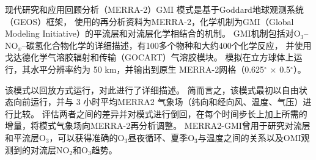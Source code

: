 现代研究和应用回顾分析（MERRA-2）GMI 模式是基于Goddard地球观测系统（GEOS）框架\citep{Molod.2015}，
使用的再分析资料为MERRA-2\citep{Gelaro.2017}，化学机制为GMI（Global Modeling Initiative）的平流层和对流层化学相结合的机制\citep{Duncan.2007,Oman.2013,Nielsen.2017}。
GMI机制包括对O$_3$--NO$_x$--碳氢化合物化学的详细描述，有100多个物种和大约400个化学反应，
并使用戈达德化学气溶胶辐射和传输（GOCART）气溶胶模块。
模拟在立方球体上运行，其水平分辨率约为 50 km，并输出到原生 MERRA-2网格（0.625$^{\circ}$ $\times$ 0.5$^{\circ}$）。

该模式以回放方式运行，\citet{Orbe.2017}对此进行了详细描述。
简而言之，该模式最初以自由状态向前运行，并与 3 小时平均MERRA2 气象场（纬向和经向风、温度、气压）进行比较。
评估两者之间的差异并对模式进行倒回，在每个时间步长上加上所需的增量，将模式气象场向MERRA-2再分析调整。
MERRA2-GMI曾用于研究对流层和平流层O$_3$，可以获得准确的O$_3$昼夜循环、夏季O$_3$与温度之间的关系以及OMI观测到的对流层NO$_2$和O$_3$趋势\citep{Strode.2017,Ziemke.2017,Ziemke.2019}。
